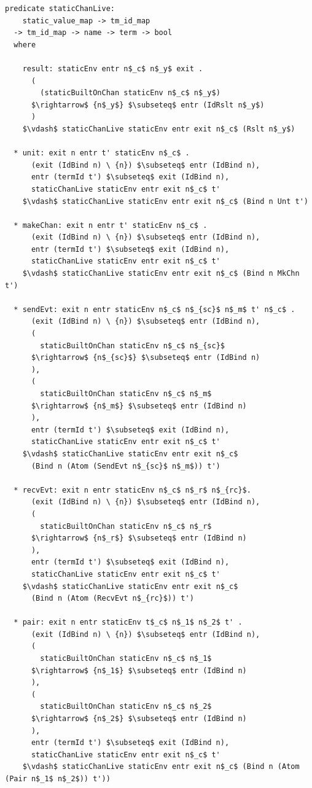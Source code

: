 \documentclass[letterpaper, 11pt]{report}
\begin{document}
\begin{lstlisting}[language=logic, mathescape]
  predicate staticChanLive:
    static_value_map -> tm_id_map 
  -> tm_id_map -> name -> term -> bool
  where

    result: staticEnv entr n$_c$ n$_y$ exit .
      (
        (staticBuiltOnChan staticEnv n$_c$ n$_y$)
      $\rightarrow$ {n$_y$} $\subseteq$ entr (IdRslt n$_y$)
      )
    $\vdash$ staticChanLive staticEnv entr exit n$_c$ (Rslt n$_y$)

  * unit: exit n entr t' staticEnv n$_c$ .
      (exit (IdBind n) \ {n}) $\subseteq$ entr (IdBind n),
      entr (termId t') $\subseteq$ exit (IdBind n),
      staticChanLive staticEnv entr exit n$_c$ t'
    $\vdash$ staticChanLive staticEnv entr exit n$_c$ (Bind n Unt t')

  * makeChan: exit n entr t' staticEnv n$_c$ .
      (exit (IdBind n) \ {n}) $\subseteq$ entr (IdBind n),
      entr (termId t') $\subseteq$ exit (IdBind n),
      staticChanLive staticEnv entr exit n$_c$ t'
    $\vdash$ staticChanLive staticEnv entr exit n$_c$ (Bind n MkChn t')

  * sendEvt: exit n entr staticEnv n$_c$ n$_{sc}$ n$_m$ t' n$_c$ .
      (exit (IdBind n) \ {n}) $\subseteq$ entr (IdBind n),
      (
        staticBuiltOnChan staticEnv n$_c$ n$_{sc}$
      $\rightarrow$ {n$_{sc}$} $\subseteq$ entr (IdBind n)
      ),
      (
        staticBuiltOnChan staticEnv n$_c$ n$_m$
      $\rightarrow$ {n$_m$} $\subseteq$ entr (IdBind n)
      ),
      entr (termId t') $\subseteq$ exit (IdBind n),
      staticChanLive staticEnv entr exit n$_c$ t'
    $\vdash$ staticChanLive staticEnv entr exit n$_c$
      (Bind n (Atom (SendEvt n$_{sc}$ n$_m$)) t')

  * recvEvt: exit n entr staticEnv n$_c$ n$_r$ n$_{rc}$.   
      (exit (IdBind n) \ {n}) $\subseteq$ entr (IdBind n),
      (
        staticBuiltOnChan staticEnv n$_c$ n$_r$
      $\rightarrow$ {n$_r$} $\subseteq$ entr (IdBind n)
      ),
      entr (termId t') $\subseteq$ exit (IdBind n),
      staticChanLive staticEnv entr exit n$_c$ t'
    $\vdash$ staticChanLive staticEnv entr exit n$_c$
      (Bind n (Atom (RecvEvt n$_{rc}$)) t')

  * pair: exit n entr staticEnv t$_c$ n$_1$ n$_2$ t' .
      (exit (IdBind n) \ {n}) $\subseteq$ entr (IdBind n),
      (
        staticBuiltOnChan staticEnv n$_c$ n$_1$
      $\rightarrow$ {n$_1$} $\subseteq$ entr (IdBind n)
      ),
      (
        staticBuiltOnChan staticEnv n$_c$ n$_2$
      $\rightarrow$ {n$_2$} $\subseteq$ entr (IdBind n)
      ),
      entr (termId t') $\subseteq$ exit (IdBind n),
      staticChanLive staticEnv entr exit n$_c$ t'
    $\vdash$ staticChanLive staticEnv entr exit n$_c$ (Bind n (Atom (Pair n$_1$ n$_2$)) t'))


\end{lstlisting}
\end{document}
